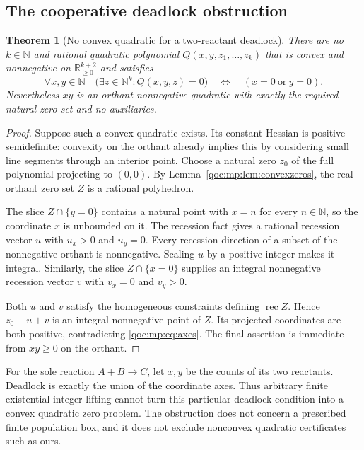 \documentclass[11pt,letterpaper]{article}
\newtheorem{theorem}{Theorem}[section]
\theoremstyle{definition}
\theoremstyle{remark}
\newcommand{\N}{\mathbb N}
\newcommand{\R}{\mathbb R}
\newcommand{\rec}{\operatorname{rec}}
\begin{document}
\subsection{The cooperative deadlock obstruction}
\begin{theorem}[No convex quadratic for a two-reactant deadlock]\label{qoc:mp:thm:convexno}
There are no $k\in\N$ and rational quadratic polynomial
$Q(x,y,z_1,\ldots,z_k)$ that is convex and nonnegative on
$\R_{\ge0}^{k+2}$ and satisfies
\begin{equation}\label{qoc:mp:eq:axes}
 \forall x,y\in\N\quad
 \bigl(\exists z\in\N^k:Q(x,y,z)=0\bigr)
 \quad\Longleftrightarrow\quad (x=0\ \text{or}\ y=0).
\end{equation}
Nevertheless $xy$ is an orthant-nonnegative quadratic with exactly the
required natural zero set and no auxiliaries.
\end{theorem}
\begin{proof}
Suppose such a convex quadratic exists. Its constant Hessian is positive
semidefinite: convexity on the orthant already implies this by considering
small line segments through an interior point. Choose a natural zero
$z_0$ of the full polynomial projecting to $(0,0)$. By
Lemma~\ref{qoc:mp:lem:convexzeros}, the real orthant zero set $Z$ is a rational
polyhedron.

The slice $Z\cap\{y=0\}$ contains a natural point with $x=n$ for every
$n\in\N$, so the coordinate $x$ is unbounded on it. The recession fact
gives a rational recession vector $u$ with $u_x>0$ and $u_y=0$.
Every recession direction of a subset of the nonnegative orthant is
nonnegative. Scaling $u$ by a positive integer makes it integral.
Similarly, the slice $Z\cap\{x=0\}$ supplies an integral nonnegative
recession vector $v$ with $v_x=0$ and $v_y>0$.

Both $u$ and $v$ satisfy the homogeneous constraints defining $\rec Z$.
Hence $z_0+u+v$ is an integral nonnegative point of $Z$. Its projected
coordinates are both positive, contradicting \eqref{qoc:mp:eq:axes}.
The final assertion is immediate from $xy\ge0$ on the orthant.
\end{proof}

For the sole reaction $A+B\to C$, let $x,y$ be the counts of its two
reactants. Deadlock is exactly the union of the coordinate axes.
Thus arbitrary finite existential integer lifting cannot turn this
particular deadlock condition into a convex quadratic zero problem.
The obstruction does not concern a prescribed finite population box,
and it does not exclude nonconvex quadratic certificates such as ours.
\end{document}
